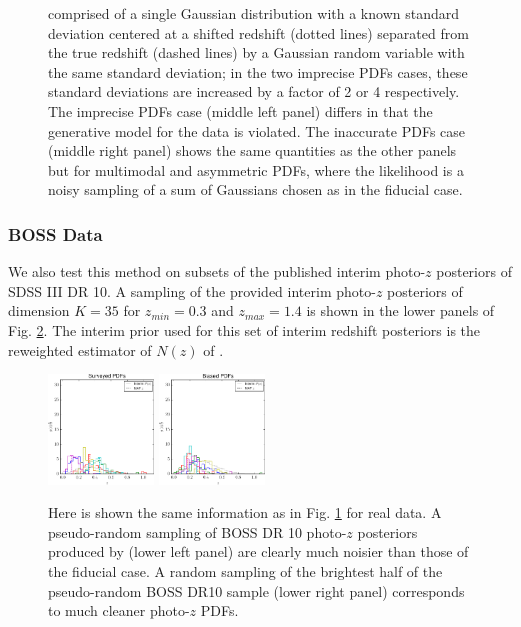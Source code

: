 \documentclass[preprint]{aastex}
\begin{document}
\begin{figure}
{comprised of a single Gaussian distribution with a known standard deviation 
centered at a shifted redshift (dotted lines) separated from the true redshift 
(dashed lines) by a Gaussian random variable with the same standard deviation; 
in the two imprecise PDFs cases, these standard deviations are increased by a 
factor of 2 or 4 respectively.  The imprecise PDFs case (middle left panel) 
differs in that the generative model for the data is violated.  The inaccurate 
PDFs case (middle right panel) shows the same quantities as the other panels 
but for multimodal and asymmetric PDFs, where the likelihood is a noisy 
sampling of a sum of Gaussians chosen as in the fiducial case.}
\label{fig:allpzs}
\end{figure}

\subsubsection{BOSS Data}
\label{sec:data}

We also test this method on subsets of the published interim photo-$z$ 
posteriors of SDSS III DR 10.  A sampling of the provided interim photo-$z$ 
posteriors of dimension $K=35$ for $z_{min}=0.3$ and $z_{max}=1.4$ is shown in 
the lower panels of Fig. \ref{fig:datapzs}.  The interim prior used for this 
set of interim redshift posteriors is the reweighted estimator of $N(z)$ of 
\citet{Sheldon2012}.

\begin{figure}
\includegraphics[width=0.25\textwidth]{figs/boss/samplepzs.pdf}
\includegraphics[width=0.25\textwidth]{figs/bias/samplepzs.pdf}
\caption{Here is shown the same information as in Fig. \ref{fig:allpzs} for 
real data.  A pseudo-random sampling of BOSS DR 10 photo-$z$ posteriors 
produced by \citet{Sheldon2012} (lower left panel) are clearly much noisier 
than those of the fiducial case.  A random sampling of the brightest half of 
the pseudo-random BOSS DR10 sample (lower right panel) corresponds to much 
cleaner photo-$z$ PDFs.}
\label{fig:datapzs}
\end{figure}
\end{document}
